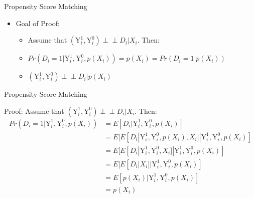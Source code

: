 \documentclass[hyperref={pdfpagelabels=false}]{beamer}
\newcommand{\indep}{\perp\!\!\!\perp}
\begin{document}
\begin{frame}{Propensity Score Matching}
		\begin{itemize}
	\item Goal of Proof: 
	
	\begin{itemize}
	\item Assume that $ (\mathrm{Y}^{1}_{i},\mathrm{Y}^{0}_{i})\indep D_{i}|X_{i}$. Then:
		\vspace{0.2cm}
		\item[$\Rightarrow$] $Pr(D_{i}=1|\mathrm{Y}^{1}_{i},\mathrm{Y}^{0}_{i},p(X_{i}))=p(X_{i})=Pr(D_{i}=1|p(X_{i}))$
		\vspace{0.2cm}
		\item[$\Rightarrow$] $(\mathrm{Y}^{1}_{i},\mathrm{Y}^{0}_{i})\indep D_{i}|p(X_{i})$
	\end{itemize}
	
	
		\end{itemize}
	

	
	
\end{frame}





\begin{frame}{Propensity Score Matching}

Proof: Assume that $ (\mathrm{Y}^{1}_{i},\mathrm{Y}^{0}_{i})\indep D_{i}|X_{i}$. Then:
	\begin{equation*}
	\begin{aligned}
	Pr(D_{i}=1|\mathrm{Y}^{1}_{i},\mathrm{Y}^{0}_{i},p(X_{i}))
	&= E[D_{i}|\mathrm{Y}^{1}_{i},\mathrm{Y}^{0}_{i},p(X_{i})]\\
	&= E[E[D_{i}|\mathrm{Y}^{1}_{i},\mathrm{Y}^{0}_{i},p(X_{i}),X_{i}]|\mathrm{Y}^{1}_{i},\mathrm{Y}^{0}_{i},p(X_{i})]\\
	&= E[E[D_{i}|\mathrm{Y}^{1}_{i},\mathrm{Y}^{0}_{i},X_{i}]|\mathrm{Y}^{1}_{i},\mathrm{Y}^{0}_{i},p(X_{i})]\\
	&= E[E[D_{i}|X_{i}]|\mathrm{Y}^{1}_{i},\mathrm{Y}^{0}_{i},p(X_{i})]\\
	&= E[p(X_{i})|\mathrm{Y}^{1}_{i},\mathrm{Y}^{0}_{i},p(X_{i})] \\
	&= p(X_{i})
	\end{aligned}
	\end{equation*}

\end{frame}
\end{document}
